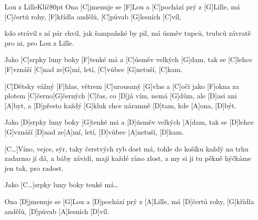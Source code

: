 \begin{song}{Lou z Lille}{Klíč}{80pt}
%
Ona [C]jmenuje se [F]Lou a [C]pochází prý z [G]Lille,
má [C]{}čertů rohy, [F]křídla andělů, [C]půvab [G]lesních [C]víl,

kdo strávil s ní pár chvil, jak šampaňské by pil,
má úsměv tupců, trubců závratě pro ni, pro Lou z Lille.

%
\rl Jako [C]srpky luny boky [F]tenké má a [C]{}úsměv velkých [G]dam,
tak se [C]lehce [F]vznáší [C]nad ze[G]mí, letí, [C]vůbec [G]netuší, [C]kam.\rr{}

\verse{*}%
[C]Dětsky vážný [F]hlas, větrem [C]urousaný [G]vlas
a [C]oči jako [F]okna za plotem [C]{}černo[G]{}černých [C]{}řas,
co [D]já vím, nemá [G]dům, ale [D]asi ani [A]byt,
a [D]přesto každý [G]kluk chce náramně [D]tam, kde [A]ona, [D]být.

%
\rl Jako [D]srpky luny boky [G]tenké má a [D]{}úsměv velkých [A]dam,
tak se [D]lehce [G]vznáší [D]nad ze[A]mí, letí, [D]vůbec [A]netuší, [D]kam.\rr{}

%
[C\dots]Víno, vejce, sýr, taky čerstvých ryb dost má,
tohle do košíku každý na trhu zadarmo jí dá,
a báby závidí, mají každé ráno zlost,
a my si ji tu pěkně hýčkáme jen tak, pro radost.

 Jako [C\dots]srpky luny boky tenké má\dots

\verse{*}%
Ona [D]jmenuje se [G]Lou a [D]pochází prý z [A]Lille,
má [D]{}čertů rohy, [G]křídla andělů, [D]půvab [A]lesních [D]víl.
\end{song}

